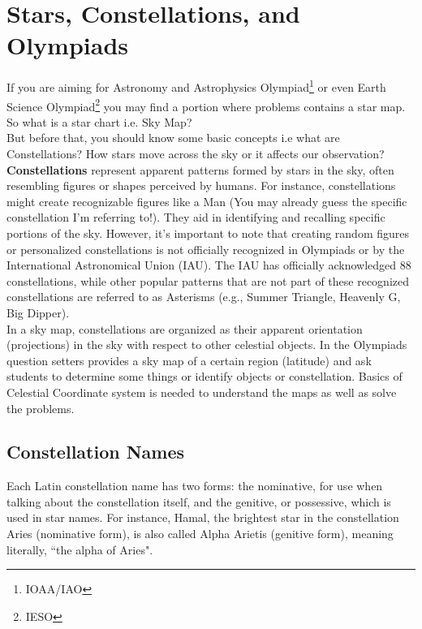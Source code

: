 \documentclass[a4paper,12pt]{extarticle}
\begin{document}
\section{Stars, Constellations, and Olympiads}
 
If you are aiming for Astronomy and Astrophysics Olympiad\footnote{IOAA/IAO} or even Earth Science Olympiad\footnote{IESO} you may find a portion  where problems contains a star map. So what is a star chart i.e. Sky Map?\\

But before that, you should know some basic concepts i.e what are Constellations? How stars move across the sky or it affects our observation? \\

\textbf{Constellations} represent apparent patterns formed by stars in the sky, often resembling figures or shapes perceived by humans. For instance, constellations might create recognizable figures like a Man (You may already guess the specific constellation I'm referring to!). They aid in identifying and recalling specific portions of the sky. However, it's important to note that creating random figures or personalized constellations is not officially recognized in Olympiads or by the International Astronomical Union (IAU). The IAU has officially acknowledged 88 constellations, while other popular patterns that are not part of these recognized constellations are referred to as Asterisms (e.g., Summer Triangle, Heavenly G, Big Dipper).\\

In a sky map, constellations are organized as their apparent orientation (projections) in the sky with respect to other celestial objects. In the Olympiads question setters provides a sky map of a certain region (latitude) and ask students to determine some things or identify objects or constellation. Basics of
Celestial Coordinate system is needed to understand the maps as well as solve the problems.

\subsection{Constellation Names}

Each Latin constellation name has two forms: the nominative, for use when talking about the constellation itself, and the genitive, or possessive, which is used in star names. For instance, Hamal, the brightest star in the constellation Aries (nominative form), is also called Alpha Arietis (genitive form), meaning literally, ``the alpha of Aries".\\
\end{document}
